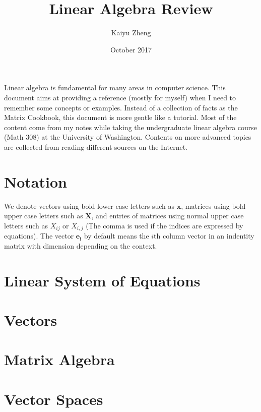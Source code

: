 \documentclass[11pt]{article}
\title{Linear Algebra Review}
\author{Kaiyu Zheng}
\date{October 2017}
\theoremstyle{definition}
\begin{document}
\maketitle

\noindent Linear algebra is fundamental for many areas in computer science. This document aims at providing a reference (mostly for myself) when I need to remember some concepts or examples. Instead of a collection of facts as the Matrix Cookbook, this document is more gentle like a tutorial. Most of the content come from my notes while taking the undergraduate linear algebra course (Math 308) at the University of Washington. Contents on more advanced topics are collected from reading different sources on the Internet.

\begin{multicols}{2}
\setlength{\columnseprule}{0.4pt}
  \tableofcontents
\end{multicols}

\section*{Notation}
We denote vectors using bold lower case letters such as $\bm{x}$, matrices using bold upper case letters such as $\bm{X}$, and entries of matrices using normal upper case letters such as $X_{ij}$ or $X_{i,j}$ (The comma is used if the indices are expressed by equations).  The vector $\bm{e_i}$ by default means the $i$th column vector in an indentity matrix with dimension depending on the context.

\section{Linear System of Equations}
\label{sec:linsys}


\section{Vectors}
\label{sec:vectors}


\section{Matrix Algebra}
\label{sec:malg}


\section{Vector Spaces}
\label{sec:vecspace}

\end{document}

